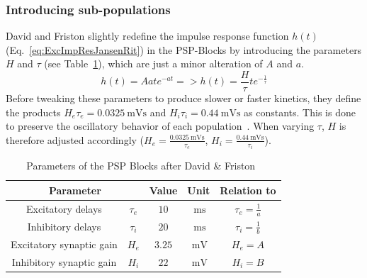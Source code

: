 \subsubsection{Introducing sub-populations}

David and Friston slightly redefine the impulse response function $h(t)$ (Eq.~\ref{eq:ExcImpResJansenRit})
in the PSP-Blocks by introducing the parameters $H$ and $\tau$ (see Table~\ref{tab:davidfriston}),
which are just a minor alteration of $A$ and $a$.
\[ h(t)=Aate^{-at} => h(t)=\frac{H}{\tau}te^{-\frac{1}{\tau}} \]
Before tweaking these parameters to produce slower or faster kinetics,
they define the products $H_e\tau_e=\SI{0.0325}{\milli\volt\second}$ and $H_i\tau_i=\SI{0.44}{\milli\volt\second}$ as constants.
This is done to preserve the oscillatory behavior of each population~\parencite{david_neural_2003}.
When varying $\tau$, $H$ is therefore adjusted
accordingly ($H_e=\frac{\SI{0.0325}{\milli\volt\second}}{\tau_e}$, $H_i=\frac{\SI{0.44}{\milli\volt\second}}{\tau_i}$).
\begin{table}[H]
    \centering
    \begin{tabular}{ |c|c|c|c|c| }
        \hline
        \multicolumn{2}{|c|}{Parameter} & Value & Unit & Relation to \parencite{jansen_electroencephalogram_1995} \\
        \hline
        \hline
        \rule{0pt}{3ex}Excitatory delays        & \(\tau_e\) & \(10\) & $\SI{}{\milli\second}$  & $ \tau_e = \frac{1}{a} $ \\[1.2ex]
        \hline
        \rule{0pt}{3ex}Inhibitory delays        & \(\tau_i\) & \(20\) & $\SI{}{\milli\second}$  & $ \tau_i = \frac{1}{b} $\\[1.2ex]
        \hline
        \rule{0pt}{3ex}Excitatory synaptic gain & \(H_e\)    & \(3.25\) & $\SI{}{\milli\volt}$ & $ H_e = A $ \\[1.2ex]
        \hline
        \rule{0pt}{3ex}Inhibitory synaptic gain & \(H_i\)    & \(22\)   & $\SI{}{\milli\volt}$ & $ H_i = B $ \\[1.2ex]
        \hline
    \end{tabular}
    \caption{Parameters of the PSP Blocks after David \& Friston~\cite{david_neural_2003}}
    \label{tab:davidfriston}
\end{table}
 \\[1em]

